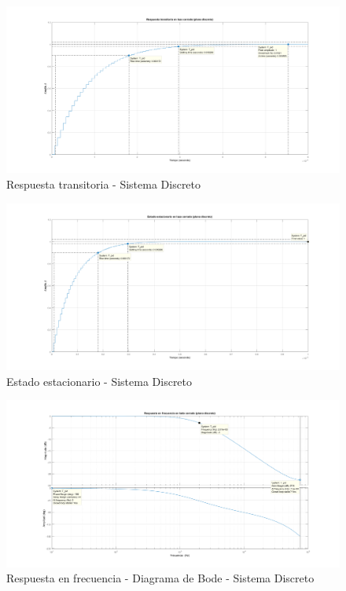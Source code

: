 \documentclass[12pt]{report}
\begin{document}
	\begin{figure}
		\centering
		\includegraphics[width=\textwidth,height=\textheight,keepaspectratio]{buck_step_response_discrete} 
		\caption{Respuesta transitoria - Sistema Discreto}
		\label{buck:step_discrete}
	\end{figure}
	
	\begin{figure}
		\centering
		\includegraphics[width=\textwidth,height=\textheight,keepaspectratio]{buck_steady_state_discrete} 
		\caption{Estado estacionario - Sistema Discreto}
		\label{buck:steady_state_discrete}
	\end{figure}
	
	\begin{figure}
		\centering
		\includegraphics[width=\textwidth,height=\textheight,keepaspectratio]{buck_bode_discrete} 
		\caption{Respuesta en frecuencia - Diagrama de Bode - Sistema Discreto}
		\label{buck:bode_discrete}
	\end{figure}
	
\end{document}
